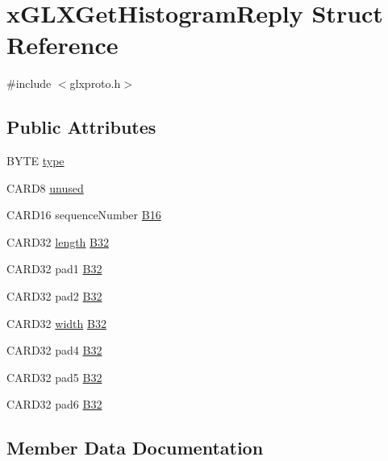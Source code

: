 \hypertarget{structx_g_l_x_get_histogram_reply}{}\section{x\+G\+L\+X\+Get\+Histogram\+Reply Struct Reference}
\label{structx_g_l_x_get_histogram_reply}


{\ttfamily \#include $<$glxproto.\+h$>$}

\subsection*{Public Attributes}
\begin{DoxyCompactItemize}
\item 
B\+Y\+TE \hyperlink{structx_g_l_x_get_histogram_reply_a12a360abd6343f2844b6fd37aa0fe739}{type}
\item 
C\+A\+R\+D8 \hyperlink{structx_g_l_x_get_histogram_reply_a0687b6d986226bac70741b73dbf881f5}{unused}
\item 
C\+A\+R\+D16 sequence\+Number \hyperlink{structx_g_l_x_get_histogram_reply_a27f5d4f9ed7427874b1830cd6275deae}{B16}
\item 
C\+A\+R\+D32 \hyperlink{glcorearb_8h_ab9c919755bde3b34349e23a32b4e0fa7}{length} \hyperlink{structx_g_l_x_get_histogram_reply_af604a28145bf687b02c590474cba9866}{B32}
\item 
C\+A\+R\+D32 pad1 \hyperlink{structx_g_l_x_get_histogram_reply_ad7260c9c3f81cf272a2e41af7f603bf1}{B32}
\item 
C\+A\+R\+D32 pad2 \hyperlink{structx_g_l_x_get_histogram_reply_a06a1e580d6d5d6409a9d4e43b7f5fcd4}{B32}
\item 
C\+A\+R\+D32 \hyperlink{gl_8h_a9a82cf3caff84cabc4598e2619faac17}{width} \hyperlink{structx_g_l_x_get_histogram_reply_a438ba338275b1707f2062b34e20442e7}{B32}
\item 
C\+A\+R\+D32 pad4 \hyperlink{structx_g_l_x_get_histogram_reply_a9f939c1c15d564c5af3824d763dc508b}{B32}
\item 
C\+A\+R\+D32 pad5 \hyperlink{structx_g_l_x_get_histogram_reply_acf051edf03ac4816968b8923457756f5}{B32}
\item 
C\+A\+R\+D32 pad6 \hyperlink{structx_g_l_x_get_histogram_reply_a0a37933e82286e23d758203e1e7599b7}{B32}
\end{DoxyCompactItemize}


\subsection{Member Data Documentation}
\mbox{\label{structx_g_l_x_get_histogram_reply_a27f5d4f9ed7427874b1830cd6275deae}} 
